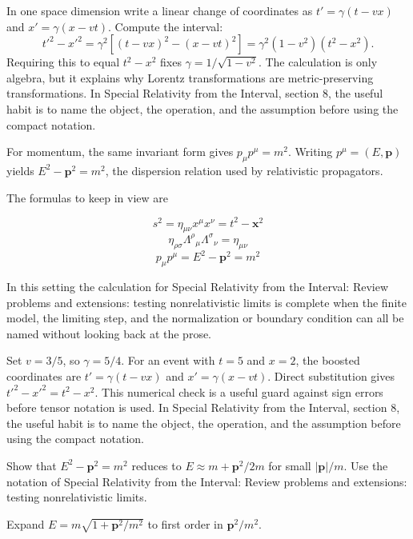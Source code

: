 In one space dimension write a linear change of coordinates as \(t'=\gamma(t-vx)\) and \(x'=\gamma(x-vt)\).  Compute the interval:
\[
  t'^2-x'^2
  =
  \gamma^2[(t-vx)^2-(x-vt)^2]
  =
  \gamma^2(1-v^2)(t^2-x^2).
\]
Requiring this to equal \(t^2-x^2\) fixes \(\gamma=1/\sqrt{1-v^2}\).  The calculation is only algebra, but it explains why Lorentz transformations are metric-preserving transformations.  In Special Relativity from the Interval, section 8, the useful habit is to name the object, the operation, and the assumption before using the compact notation.

For momentum, the same invariant form gives \(p_\mu p^\mu=m^2\).  Writing \(p^\mu=(E,\bm p)\) yields \(E^2-\bm p^2=m^2\), the dispersion relation used by relativistic propagators.

The formulas to keep in view are

\[
  s^2=\eta_{\mu\nu}x^\mu x^\nu=t^2-\bm x^2
\]
\[
  \eta_{\rho\sigma}\Lambda^\rho{}_\mu\Lambda^\sigma{}_\nu=\eta_{\mu\nu}
\]
\[
  p_\mu p^\mu=E^2-\bm p^2=m^2
\]

In this setting the calculation for Special Relativity from the Interval: Review problems and extensions: testing nonrelativistic limits is complete when the finite model, the limiting step, and the normalization or boundary condition can all be named without looking back at the prose.




\begin{example}
Set \(v=3/5\), so \(\gamma=5/4\).  For an event with \(t=5\) and \(x=2\), the boosted coordinates are \(t'=\gamma(t-vx)\) and \(x'=\gamma(x-vt)\).  Direct substitution gives \(t'^2-x'^2=t^2-x^2\).  This numerical check is a useful guard against sign errors before tensor notation is used.  In Special Relativity from the Interval, section 8, the useful habit is to name the object, the operation, and the assumption before using the compact notation.
\end{example}



\begin{exercise}
Show that \(E^2-\bm p^2=m^2\) reduces to \(E\approx m+\bm p^2/2m\) for small \(|\bm p|/m\).  Use the notation of Special Relativity from the Interval: Review problems and extensions: testing nonrelativistic limits.
\begin{answer}
Expand \(E=m\sqrt{1+\bm p^2/m^2}\) to first order in \(\bm p^2/m^2\).
\end{answer}
\end{exercise}

